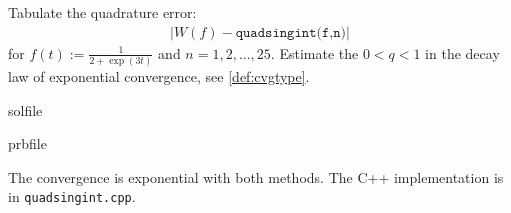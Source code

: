 \begin{samproblem}
%   
%     

\begin{subproblem}[1]
  Tabulate the quadrature error:
  \begin{align*}
    \lvert W(f) - \texttt{quadsingint(f,n)} \rvert
  \end{align*}
  for $f(t) := \frac{1}{2+\exp(3t)}$ and $n = 1,2,...,25$. 
  Estimate the $0 < q <  1$ in the decay law of exponential convergence, see \cref{def:cvgtype}. 

  \begin{samwriteprbpart}{solfile}
    \begin{writeverbatim}{prbfile}
      \begin{samsolution}
        The convergence is exponential with both methods. The C++ implementation is in \verb|quadsingint.cpp|.
      \end{samsolution}
    \end{writeverbatim}
  \end{samwriteprbpart}
\end{subproblem}
 
\end{samproblem}
